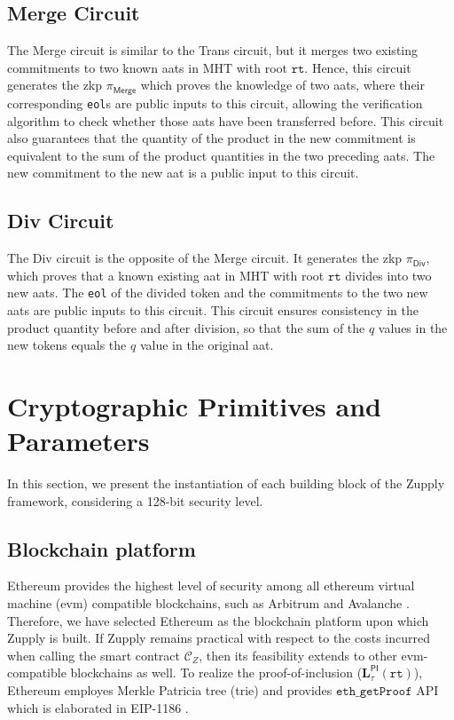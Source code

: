 \subsection{\textsf{Merge} Circuit} 
The \textsf{Merge} circuit is similar to the \textsf{Trans} circuit, but it merges two existing commitments to two known \gls{aat}s in \textsf{MHT} with root $\texttt{rt}$. Hence, this circuit generates the \gls{zkp} $\pi_\textsf{Merge}$ which proves the knowledge of two \gls{aat}s, where their corresponding \texttt{eol}s are public inputs to this circuit, allowing the verification algorithm to check whether those \gls{aat}s have been transferred before. This circuit also guarantees that the quantity of the product in the new commitment is equivalent to the sum of the product quantities in the two preceding \gls{aat}s. The new commitment to the new \gls{aat} is a public input to this circuit.


\subsection{\textsf{Div} Circuit} 
The \textsf{Div} circuit is the opposite of the \textsf{Merge} circuit. It generates the \gls{zkp} $\pi_\textsf{Div}$, which proves that a known existing \gls{aat} in \textsf{MHT} with root $\texttt{rt}$ divides into two new \gls{aat}s. The \texttt{eol} of the divided token and the commitments to the two new \gls{aat}s are public inputs to this circuit. This circuit ensures consistency in the product quantity before and after division, so that the sum of the $q$ values in the new tokens equals the $q$ value in the original \gls{aat}.


\section{Cryptographic Primitives and Parameters} \label{sec:zupply_primitive_and_parameters}
In this section, we present the instantiation of each building block  of the Zupply framework, considering a 128-bit security level. 

\subsection{Blockchain platform }
Ethereum provides the highest level of security among all ethereum virtual machine (\gls{evm}) compatible blockchains, such as Arbitrum and Avalanche \cite{Neiheiser2023PracticalLimitations, Kalodner2018Arbitrum, Avalanche}. Therefore, we have selected Ethereum as the blockchain platform upon which Zupply is built. If Zupply remains practical with respect to the costs incurred when calling the smart contract $\mathcal{C}_Z$, then its feasibility extends to other \gls{evm}-compatible blockchains as well. To realize the proof-of-inclusion ($\mathbf{L}_\tau^\mathsf{PI}(\texttt{rt})$), Ethereum employes Merkle Patricia tree (trie) \cite{PatriciaTree, ethereum} and provides $\texttt{eth\_getProof}$ API which is elaborated in EIP-1186 \cite{Jentzsch2018}. 


